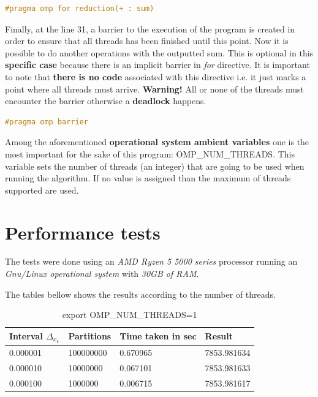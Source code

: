 		\begin{lstlisting}[language=C++]
#pragma omp for reduction(+ : sum)
		\end{lstlisting}
	
		\par Finally, at the line 31, a barrier to the execution of the program is created in order to ensure that all threads has been finished until this point. Now it is possible to do another operations with the outputted sum.  This is optional in this \textbf{specific case} because there is an implicit barrier in \textit{for} directive. It is important to note that \textbf{there is no code} associated with this directive i.e. it just marks a point where all threads must arrive. \textbf{Warning!} All or none of the threads must encounter the barrier otherwise a \textbf{deadlock} happens.
		
		\begin{lstlisting}[language=C++]
#pragma omp barrier
		\end{lstlisting}
	
		\par Among the aforementioned \textbf{operational system ambient variables} one is the most important for the sake of this program: OMP\_NUM\_THREADS. This variable sets the number of threads (an integer) that are going to be used when running the algorithm. If no value is assigned than the maximum of threads supported are used.

	\section{Performance tests}
		\par The tests were done using an \textit{AMD Ryzen 5 5000 series} processor running an \textit{Gnu/Linux operational system} with \textit{30GB of RAM}.\newline
		
		\par The tables bellow shows the results according to the number of threads. 
		
		\begin{table}[h]
			\caption{export OMP\_NUM\_THREADS=1}
			\begin{center}
				\begin{tabular}{|l|l|l|l|}
					\hline
					Interval $\Delta_{x_k}$  &  Partitions  &  Time taken in sec &  Result \\
					\hline
					0.000001  &  100000000  &  0.670965  &  7853.981634 \\
					\hline
					0.000010  &  10000000  &  0.067101  &  7853.981633 \\
					\hline
					0.000100  &  1000000  &  0.006715  &  7853.981617 \\
					\hline
				\end{tabular}
			\end{center}
		\end{table}
		
